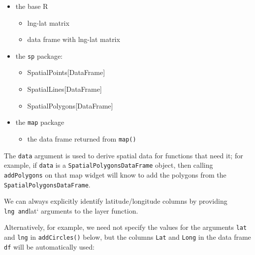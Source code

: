\documentclass[]{book}
\newenvironment{Shaded}{\begin{snugshade}}{\end{snugshade}}
\newcommand{\KeywordTok}[1]{\textcolor[rgb]{0.13,0.29,0.53}{\textbf{#1}}}
\newcommand{\DataTypeTok}[1]{\textcolor[rgb]{0.13,0.29,0.53}{#1}}
\newcommand{\DecValTok}[1]{\textcolor[rgb]{0.00,0.00,0.81}{#1}}
\newcommand{\StringTok}[1]{\textcolor[rgb]{0.31,0.60,0.02}{#1}}
\newcommand{\CommentTok}[1]{\textcolor[rgb]{0.56,0.35,0.01}{\textit{#1}}}
\newcommand{\OperatorTok}[1]{\textcolor[rgb]{0.81,0.36,0.00}{\textbf{#1}}}
\newcommand{\NormalTok}[1]{#1}
\providecommand{\tightlist}{%
  \setlength{\itemsep}{0pt}\setlength{\parskip}{0pt}}
\begin{document}
\begin{itemize}
\tightlist
\item
  the base R

  \begin{itemize}
  \tightlist
  \item
    lng-lat matrix
  \item
    data frame with lng-lat matrix
  \end{itemize}
\item
  the \texttt{sp} package:

  \begin{itemize}
  \tightlist
  \item
    SpatialPoints{[}DataFrame{]}
  \item
    SpatialLines{[}DataFrame{]}
  \item
    SpatialPolygons{[}DataFrame{]}
  \end{itemize}
\item
  the \texttt{map} package

  \begin{itemize}
  \tightlist
  \item
    the data frame returned from \texttt{map()}
  \end{itemize}
\end{itemize}

The \texttt{data} argument is used to derive spatial data for functions
that need it; for example, if \texttt{data} is a
\texttt{SpatialPolygonsDataFrame} object, then calling
\texttt{addPolygons} on that map widget will know to add the polygons
from the \texttt{SpatialPolygonsDataFrame}.

We can always explicitly identify latitude/longitude columns by
providing \texttt{lng\textasciigrave{}\textasciigrave{}\ and}lat`
arguments to the layer function.

Alternatively, for example, we need not specify the values for the
arguments \texttt{lat} and \texttt{lng} in \texttt{addCircles()} below,
but the columns \texttt{Lat} and \texttt{Long} in the data frame
\texttt{df} will be automatically used:

\begin{Shaded}
\end{Shaded}
\end{document}
